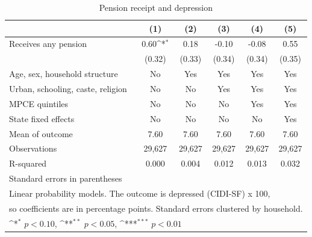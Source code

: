 \begin{table}[htbp]\centering
\def\sym#1{\ifmmode^{#1}\else\(^{#1}\)\fi}
\caption{Pension receipt and depression\label{tab:main}}
\begin{tabular}{l*{5}{c}}
\toprule
                    &\multicolumn{1}{c}{(1)}         &\multicolumn{1}{c}{(2)}         &\multicolumn{1}{c}{(3)}         &\multicolumn{1}{c}{(4)}         &\multicolumn{1}{c}{(5)}         \\
\midrule
Receives any pension&        0.60\sym{*}  &        0.18         &       -0.10         &       -0.08         &        0.55         \\
                    &      (0.32)         &      (0.33)         &      (0.34)         &      (0.34)         &      (0.35)         \\
\midrule
Age, sex, household structure&          No         &         Yes         &         Yes         &         Yes         &         Yes         \\
Urban, schooling, caste, religion&          No         &          No         &         Yes         &         Yes         &         Yes         \\
MPCE quintiles      &          No         &          No         &          No         &         Yes         &         Yes         \\
State fixed effects &          No         &          No         &          No         &          No         &         Yes         \\
Mean of outcome     &        7.60         &        7.60         &        7.60         &        7.60         &        7.60         \\
Observations        &      29,627         &      29,627         &      29,627         &      29,627         &      29,627         \\
R-squared           &       0.000         &       0.004         &       0.012         &       0.013         &       0.032         \\
\bottomrule
\multicolumn{6}{l}{\footnotesize Standard errors in parentheses}\\
\multicolumn{6}{l}{\footnotesize Linear probability models. The outcome is depressed (CIDI-SF) x 100,}\\
\multicolumn{6}{l}{\footnotesize so coefficients are in percentage points. Standard errors clustered by household.}\\
\multicolumn{6}{l}{\footnotesize \sym{*} \(p<0.10\), \sym{**} \(p<0.05\), \sym{***} \(p<0.01\)}\\
\end{tabular}
\end{table}
